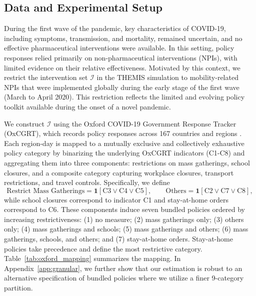 \documentclass[msom,blindrev]{informs3} %
\begin{document}
\subsection{Data and Experimental Setup}
\label{subsec:data}
{\color{blue}
	During the first wave of the pandemic, key characteristics of COVID-19, including symptoms, transmission, and mortality, remained uncertain, and no effective pharmaceutical interventions were available. In this setting, policy responses relied primarily on non-pharmaceutical interventions (NPIs), with limited evidence on their relative effectiveness. Motivated by this context, we restrict the intervention set $\mathcal{I}$ in the THEMIS simulation to mobility-related NPIs that were implemented globally during the early stage of the first wave (March to April 2020). This restriction reflects the limited and evolving policy toolkit available during the onset of a novel pandemic.

We construct $\mathcal{I}$ using the Oxford COVID-19 Government Response Tracker (OxCGRT), which records policy responses across 167 countries and regions . Each region-day is mapped to a mutually exclusive and collectively exhaustive policy category by binarizing the underlying OxCGRT indicators (C1-C8) and aggregating them into three components: restrictions on mass gatherings, school closures, and a composite category capturing workplace closures, transport restrictions, and travel controls. Specifically, we define
\[
\text{Restrict Mass Gatherings} = \mathbf{1}[\text{C3} \lor \text{C4} \lor \text{C5}],
\qquad
\text{Others} = \mathbf{1}[\text{C2} \lor \text{C7} \lor \text{C8}],
\]
while school closures correspond to indicator C1 and stay-at-home orders correspond to C6. These components induce seven bundled policies ordered by increasing restrictiveness: (1) no measure; (2) mass gatherings only; (3) others only; (4) mass gatherings and schools; (5) mass gatherings and others; (6) mass gatherings, schools, and others; and (7) stay-at-home orders. Stay-at-home policies take precedence and define the most restrictive category. Table~\ref{tab:oxford_mapping} summarizes the mapping. In Appendix~\ref{app:granular}, we further show that our estimation is robust to an alternative specification of bundled policies where we utilize a finer 9-category partition.

}
\end{document}

